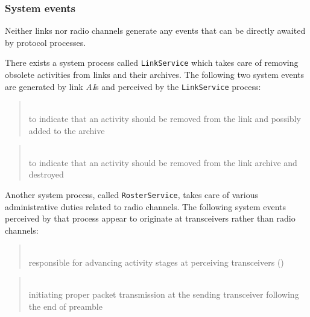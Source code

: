 \subsubsection*{System events}

\noindent
Neither links nor radio channels generate any events that can be directly
awaited by protocol processes.

There exists a system process called {\tt LinkService} which
takes care of removing obsolete activities from links
and their archives.
The following two system events are generated by link {\em AI\/}s and
perceived by the {\tt LinkService} process:

\medskip

\begin{quote}
\noindent{}\\ \hspace{0in}
to indicate that an activity should be removed from the link and possibly
added to the archive
\end{quote}

\begin{quote}
\noindent{}\\ \hspace{0in}
to indicate that an activity should be removed from the link archive and
destroyed
\end{quote}\medskip

Another system process, called {\tt RosterService}, takes care of various
administrative duties related to radio channels.
The following system events perceived by that process appear to originate
at transceivers rather than radio channels:

\medskip

\begin{quote}
\noindent{}\\ \hspace{0in}
responsible for advancing activity stages at perceiving
transceivers ()
\end{quote}

\begin{quote}
\noindent{}\\ \hspace{0in}
initiating proper packet transmission at the sending transceiver
following the end of preamble
\end{quote}

